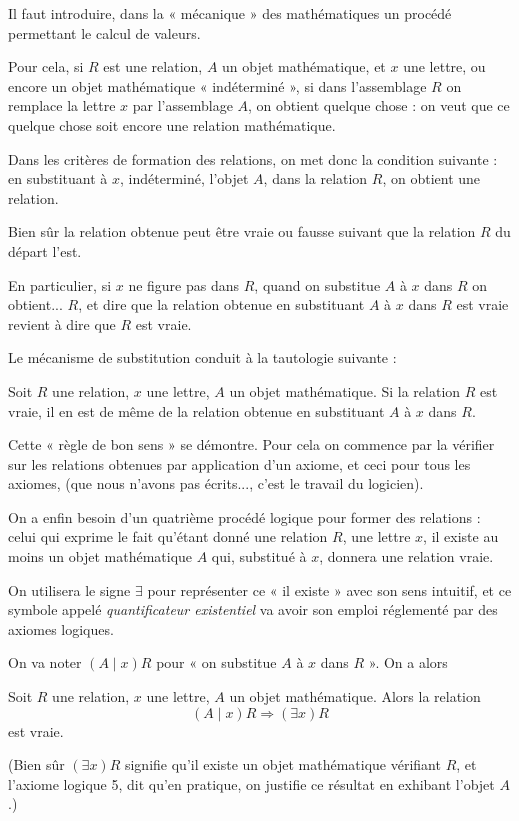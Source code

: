Il faut introduire, dans la « mécanique » des mathématiques un procédé permettant le calcul de valeurs.

Pour cela, si $R$ est une relation, $A$ un objet mathématique, et $x$ une lettre, ou encore un objet mathématique « indéterminé », si dans l'assemblage $R$ on remplace la lettre $x$ par l'assemblage $A$, on obtient quelque chose : on veut que ce quelque chose soit encore une relation mathématique.

Dans les critères de formation des relations, on met donc la condition suivante : en substituant à $x$, indéterminé, l'objet $A$, dans la relation $R$, on obtient une relation.

Bien sûr la relation obtenue peut être vraie ou fausse suivant que la relation $R$ du départ l'est.

En particulier, si $x$ ne figure pas dans $R$, quand on substitue $A$ à $x$ dans $R$ on obtient... $R$, et dire que la relation obtenue en substituant $A$ à $x$ dans $R$ est vraie revient à dire que $R$ est vraie.

Le mécanisme de substitution conduit à la tautologie suivante :
\begin{description}[leftmargin=4em,labelwidth=3.4em,labelsep=.6em,font=\itshape]
\item[(TL7)] Soit $R$ une relation, $x$ une lettre, $A$ un objet mathématique. Si la relation $R$ est vraie, il en est de même de la relation obtenue en substituant $A$ à $x$ dans $R$.
\end{description}
Cette « règle de bon sens » se démontre. Pour cela on commence par la vérifier sur les relations obtenues par application d'un axiome, et ceci pour tous les axiomes, (que nous n'avons pas écrits..., c'est le travail du logicien).

On a enfin besoin d'un quatrième procédé logique pour former des relations : celui qui exprime le fait qu'étant donné une relation $R$, une lettre $x$, il existe au moins un objet mathématique $A$ qui, substitué à $x$, donnera une relation vraie.

On utilisera le signe $\exists$ pour représenter ce « il existe » avec son sens intuitif, et ce symbole appelé \emph{quantificateur existentiel} va avoir son emploi réglementé par des axiomes logiques.

On va noter $(A\mid x)R$ pour « on substitue $A$ à $x$ dans $R$ ». On a alors
\begin{description}[leftmargin=4em,labelwidth=3.4em,labelsep=.6em,font=\itshape]
\item[(AL5)] Soit $R$ une relation, $x$ une lettre, $A$ un objet mathématique. Alors la relation
\[
(A\mid x)R\Rightarrow(\exists x)R
\]
est vraie.
\end{description}
(Bien sûr $(\exists x)R$ signifie qu'il existe un objet mathématique vérifiant $R$, et l'axiome logique 5, dit qu'en pratique, on justifie ce résultat en exhibant l'objet $A$.)

